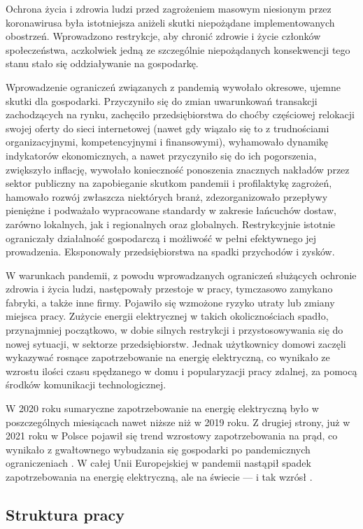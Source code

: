 \documentclass[polish, twoside, 12pt, a4paper]{article}
\theoremstyle{definition}
\theoremstyle{plain}
\theoremstyle{remark}
\begin{document}
Ochrona życia i zdrowia ludzi przed zagrożeniem masowym niesionym przez koronawirusa była istotniejsza aniżeli skutki niepożądane implementowanych obostrzeń. Wprowadzono restrykcje, aby chronić zdrowie i życie członków społeczeństwa, aczkolwiek jedną ze szczególnie niepożądanych konsekwencji tego stanu stało się oddziaływanie na gospodarkę.  

Wprowadzenie ograniczeń związanych z pandemią wywołało okresowe, ujemne skutki dla gospodarki. Przyczyniło się do zmian uwarunkowań transakcji zachodzących na rynku, zachęciło przedsiębiorstwa do choćby częściowej relokacji swojej oferty do sieci internetowej (nawet gdy wiązało się to z trudnościami organizacyjnymi, kompetencyjnymi i finansowymi), wyhamowało dynamikę indykatorów ekonomicznych, a nawet przyczyniło się do ich pogorszenia, zwiększyło inflację, wywołało konieczność ponoszenia znacznych nakładów przez sektor publiczny na zapobieganie skutkom pandemii i profilaktykę zagrożeń, hamowało rozwój zwłaszcza niektórych branż, zdezorganizowało przepływy pieniężne i podważało wypracowane standardy w zakresie łańcuchów dostaw, zarówno lokalnych, jak i regionalnych oraz globalnych. Restrykcyjnie istotnie ograniczały działalność gospodarczą i możliwość w pełni efektywnego jej prowadzenia. Eksponowały przedsiębiorstwa na spadki przychodów i zysków. 

W warunkach pandemii, z powodu wprowadzanych ograniczeń służących ochronie zdrowia i życia ludzi, następowały przestoje w pracy, tymczasowo zamykano fabryki, a także inne firmy. Pojawiło się wzmożone ryzyko utraty lub zmiany miejsca pracy. Zużycie energii elektrycznej w takich okolicznościach spadło, przynajmniej początkowo, w dobie silnych restrykcji i przystosowywania się do nowej sytuacji, w sektorze przedsiębiorstw. Jednak użytkownicy domowi zaczęli wykazywać rosnące zapotrzebowanie na energię elektryczną, co wynikało ze wzrostu ilości czasu spędzanego w domu i popularyzacji pracy zdalnej, za pomocą środków komunikacji technologicznej. 

W 2020 roku sumaryczne zapotrzebowanie na energię elektryczną było w poszczególnych miesiącach nawet niższe niż w 2019 roku. Z drugiej strony, już w 2021 roku w Polsce pojawił się trend wzrostowy zapotrzebowania na prąd, co wynikało z gwałtownego wybudzania się gospodarki po pandemicznych ograniczeniach \parencite{smyk2021}. W całej Unii Europejskiej w pandemii nastąpił spadek zapotrzebowania na energię elektryczną, ale na świecie --- i tak wzrósł \parencite{maciuch2023}. 

\subsection{Struktura pracy}
\end{document}
